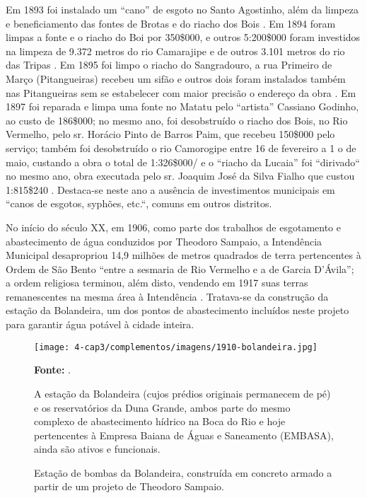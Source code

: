 Em 1893 foi instalado um “cano” de esgoto no Santo Agostinho, além da limpeza e beneficiamento das fontes de Brotas e do riacho dos Bois \cite[pp.~6-7]{salvador_relatorio_1893}. Em 1894 foram limpas a fonte e o riacho do Boi por 350\$000, e outros 5:200\$000 foram investidos na limpeza de 9.372 metros do rio Camarajipe e de outros 3.101 metros do rio das Tripas \cite[p.~156]{salvador_relatorio_1894}. Em 1895 foi limpo o riacho do Sangradouro, a rua Primeiro de Março (Pitangueiras) recebeu um sifão e outros dois foram instalados também nas Pitangueiras sem se estabelecer com maior precisão o endereço da obra \cite[pp.~20, 137-138]{salvador_relatorio_1895}. Em 1897 foi reparada e limpa uma fonte no Matatu pelo “artista” Cassiano Godinho, ao custo de 186\$000; no mesmo ano, foi desobstruído o riacho dos Bois, no Rio Vermelho, pelo sr. Horácio Pinto de Barros Paim, que recebeu 150\$000 pelo serviço; também foi desobstruído o rio Camorogipe entre 16 de fevereiro a 1 o de maio, custando a obra o total de 1:326\$000/ e o “riacho da Lucaia” foi “dirivado“ no mesmo ano, obra executada pelo sr. Joaquim José da Silva Fialho que custou 1:815\$240 \cite[p.~99-100]{salvador_relatorio_1897}. Destaca-se neste ano a ausência de investimentos municipais em “canos de esgotos, syphões, etc.“, comuns em outros distritos.

No início do século XX, em 1906, como parte dos trabalhos de esgotamento e abastecimento de água conduzidos por Theodoro Sampaio, a Intendência Municipal desapropriou 14,9 milhões de metros quadrados de terra pertencentes à Ordem de São Bento ``entre a sesmaria de Rio Vermelho e a de Garcia D'Ávila''; a ordem religiosa terminou, além disto, vendendo em 1917 suas terras remanescentes na mesma área à Intendência \cite[p.~306]{VASCONCELOS2002}. Tratava-se da construção da estação da Bolandeira, um dos pontos de abastecimento incluídos neste projeto para garantir água potável à cidade inteira.

\begin{figure}[!htp]
\centering
\caption{Estação de bombas da Bolandeira, construída em concreto armado a partir de um projeto de Theodoro Sampaio.}
\texttt{[image: 4-cap3/complementos/imagens/1910-bolandeira.jpg]}{\par \footnotesize \textbf{Fonte:} . \par A estação da Bolandeira (cujos prédios originais permanecem de pé) e os reservatórios da Duna Grande, ambos parte do mesmo complexo de abastecimento hídrico na Boca do Rio e hoje pertencentes à Empresa Baiana de Águas e Saneamento (EMBASA), ainda são ativos e funcionais.}
\label{fig:bolandeira}
\end{figure}

